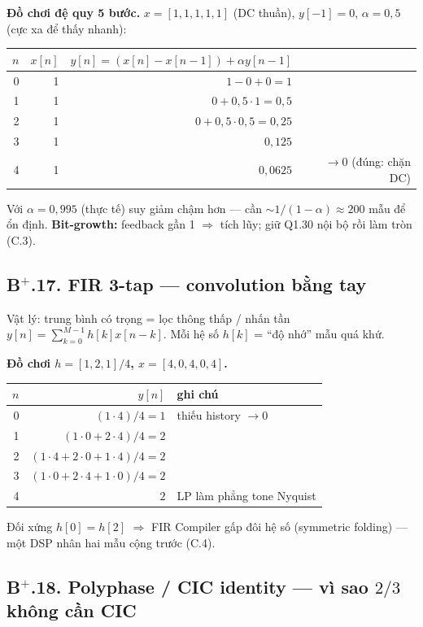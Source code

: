 \noindent\textbf{Đồ chơi đệ quy 5 bước.} $x=[1,1,1,1,1]$ (DC thuần), $y[-1]=0$, $\alpha=0{,}5$ (cực xa để thấy nhanh):
\begin{center}\small
\begin{tabular}{@{}rrrr@{}}
\toprule
$n$ & $x[n]$ & $y[n]=(x[n]-x[n-1])+\alpha y[n-1]$ & \\
\midrule
0 & 1 & $1-0+0=1$ & \\
1 & 1 & $0+0{,}5\cdot1=0{,}5$ & \\
2 & 1 & $0+0{,}5\cdot0{,}5=0{,}25$ & \\
3 & 1 & $0{,}125$ & \\
4 & 1 & $0{,}0625$ & $\to0$ (đúng: chặn DC) \\
\bottomrule
\end{tabular}
\end{center}
Với $\alpha=0{,}995$ (thực tế) suy giảm chậm hơn --- cần $\sim1/(1-\alpha)\approx200$ mẫu để ổn định. \textbf{Bit-growth:} feedback gần 1 $\Rightarrow$ tích lũy; giữ Q1.30 nội bộ rồi làm tròn (C.3).

\subsection*{B$^+$.17. FIR 3-tap --- convolution bằng tay}

\begin{firstprin}{Vật lý: trung bình có trọng = lọc thông thấp / nhấn tần}
$y[n]=\sum_{k=0}^{M-1}h[k]x[n-k]$. Mỗi hệ số $h[k]$ = ``độ nhớ'' mẫu quá khứ.
\end{firstprin}

\noindent\textbf{Đồ chơi $h=[1,2,1]/4$, $x=[4,0,4,0,4]$.}
\begin{center}\small
\begin{tabular}{@{}rrl@{}}
\toprule
$n$ & $y[n]$ & ghi chú \\
\midrule
0 & $(1\cdot4)/4=1$ & thiếu history $\to0$ \\
1 & $(1\cdot0+2\cdot4)/4=2$ & \\
2 & $(1\cdot4+2\cdot0+1\cdot4)/4=2$ & \\
3 & $(1\cdot0+2\cdot4+1\cdot0)/4=2$ & \\
4 & $2$ & LP làm phẳng tone Nyquist \\
\bottomrule
\end{tabular}
\end{center}
Đối xứng $h[0]=h[2]$ $\Rightarrow$ FIR Compiler gấp đôi hệ số (symmetric folding) --- một DSP nhân hai mẫu cộng trước (C.4).

\subsection*{B$^+$.18. Polyphase / CIC identity --- vì sao $2/3$ không cần CIC}

